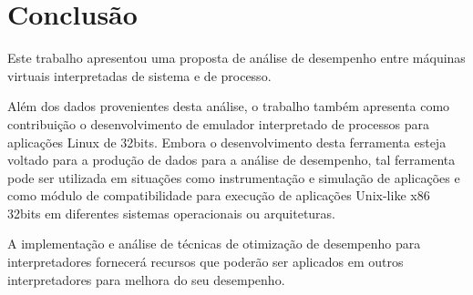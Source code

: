 \documentclass[11pt,twoside]{article}
\begin{document}
\section{Conclusão}

Este trabalho apresentou uma proposta de análise de desempenho entre máquinas virtuais interpretadas de sistema e de processo.

Além dos dados provenientes desta análise, o trabalho também apresenta como contribuição o desenvolvimento de emulador interpretado de processos para aplicações Linux de 32bits.
Embora o desenvolvimento desta ferramenta esteja voltado para a produção de dados para a análise de desempenho, tal ferramenta pode ser utilizada em situações como instrumentação e simulação de aplicações e como 
módulo de compatibilidade para execução de aplicações Unix-like x86 32bits em diferentes sistemas operacionais ou arquiteturas.

A implementação e análise de técnicas de otimização de desempenho para interpretadores fornecerá recursos que poderão ser aplicados em outros interpretadores para melhora do seu desempenho. 


\end{document}
